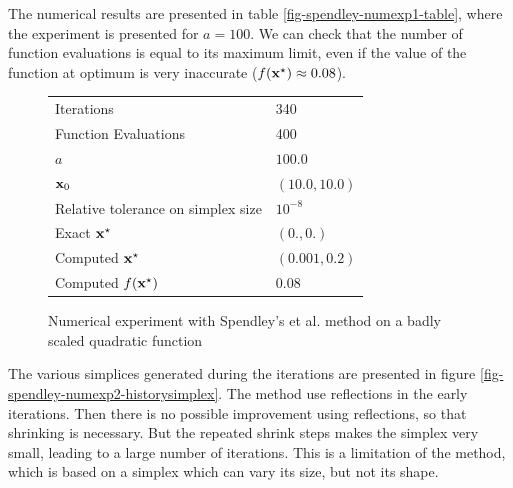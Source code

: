 The numerical results are presented in table \ref{fig-spendley-numexp1-table},
where the experiment is presented for $a=100$. We can check that the 
number of function evaluations is equal to its maximum limit, even if the value of the 
function at optimum is very inaccurate ($f(\mathbf{x}^\star) \approx 0.08$).

\begin{figure}[h]
\begin{center}
\begin{tabular}{|l|l|}
\hline
Iterations & 340 \\
Function Evaluations & 400 \\
$a$ & $100.0$ \\
$\mathbf{x}_0$ & $(10.0,10.0)$ \\
Relative tolerance on simplex size & $10^{-8}$ \\
Exact $\mathbf{x}^\star$ & $(0.,0.)$\\
Computed $\mathbf{x}^\star$ & $(0.001,0.2)$\\
Computed $f(\mathbf{x}^\star)$ & $0.08$\\
\hline
\end{tabular}
\end{center}
\caption{Numerical experiment with Spendley's et al. method on a badly scaled quadratic function}
\label{fig-spendley-numexp2-table}
\end{figure}

The various simplices generated during the iterations are 
presented in figure \ref{fig-spendley-numexp2-historysimplex}.
The method use reflections in the early iterations. Then there
is no possible improvement using reflections, so that shrinking is necessary.
But the repeated shrink steps makes the simplex very small, leading to a large number of 
iterations. This is a limitation of the method, which is based on a simplex 
which can vary its size, but not its shape.


